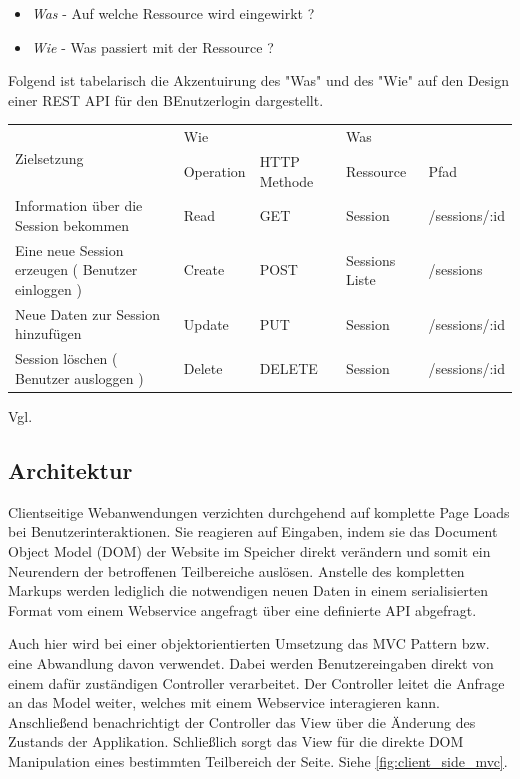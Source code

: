 \begin{itemize}
 \item \emph{Was} - Auf welche Ressource wird eingewirkt ?
 \item \emph{Wie} - Was passiert mit der Ressource ?
\end{itemize}
 
Folgend ist tabelarisch die Akzentuirung des "Was" und des "Wie" auf den Design einer REST API für den BEnutzerlogin dargestellt.

\begin{center}
    \begin{tabular}{ | p{5cm} | l | l | l | l |}
    \hline
    \multirow{2}{*}{Zielsetzung} & \multicolumn{2}{l|}{ Wie } & \multicolumn{2}{l|}{ Was } \\ \cline{2-5} 
    & Operation & HTTP Methode & Ressource & Pfad \\ \hline
    Information über die Session  bekommen & Read & GET & Session & /sessions/:id \\ \hline
    Eine neue Session erzeugen ( Benutzer einloggen ) & Create & POST & Sessions Liste & /sessions \\ \hline
    Neue Daten zur Session hinzufügen & Update & PUT & Session & /sessions/:id \\ \hline
    Session löschen ( Benutzer ausloggen ) & Delete & DELETE & Session & /sessions/:id \\ \hline  
    \end{tabular}
\end{center}

Vgl. \cite[Kap. REST and CRUD]{LaunchSchool:2016}

\subsection{Architektur}

Clientseitige Webanwendungen verzichten durchgehend auf komplette Page Loads bei Benutzerinteraktionen. Sie reagieren auf Eingaben, indem sie das Document Object Model (DOM) der Website im Speicher direkt verändern und somit ein Neurendern der betroffenen Teilbereiche auslösen. Anstelle des kompletten Markups werden lediglich die notwendigen neuen Daten in einem serialisierten Format vom einem Webservice angefragt über eine definierte API abgefragt. 

Auch hier wird bei einer objektorientierten Umsetzung das MVC Pattern bzw. eine Abwandlung davon verwendet. Dabei werden Benutzereingaben direkt von einem dafür zuständigen Controller verarbeitet. Der Controller leitet die Anfrage an das Model weiter, welches mit einem Webservice interagieren kann. Anschließend benachrichtigt der Controller das View über die Änderung des Zustands der Applikation. Schließlich sorgt das View für die direkte DOM Manipulation eines bestimmten Teilbereich der Seite.
Siehe \ref{fig:client_side_mvc}.

